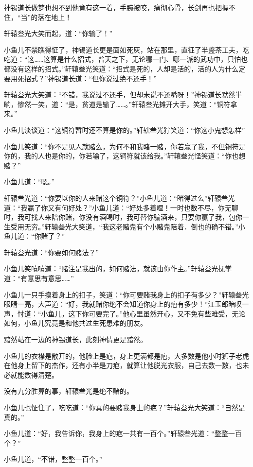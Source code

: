 \documentclass[12pt,oneside]{book}
\begin{document}
神锡道长做梦也想不到他竟有这一着，手腕被咬，痛彻心骨，长剑再也把握不住，``当''的落在地上！

轩辕叁光大笑而起，道：``你输了！''

小鱼儿不禁瞧得怔了，神锡道长更是面如死灰，站在那里，直征了半盏茶工夫，吃吃道：``这\ldots\ldots 这算是什么招式，普天之下，无论哪一门、哪一派的武功中，只怕也都没有这样的招式。''轩辕叁光笑道：``招式是死的，人却是活的，活的人为什么定要用死招式？''神锡道长道：``但你说过绝不还手！''

轩辕叁光大笑道：``不错，我说过不还手，但却未说不还嘴呀！''神锡道长默然半晌，惨然一笑，道：``是，贫道是输了\ldots\ldots。''轩辕叁光摊开大手，笑道：``铜符拿来。''

小鱼儿淡谈道：``这铜符暂时还不算是你的。''轩辖叁光狞笑道：``你这小鬼想怎样''

小鱼儿笑道：``你不是见人就赌么，为何不和我睹一赌，你若赢了我，不但铜符是你的，我的人也是你的，你若输了，这铜符就该给我。''轩辕叁光怪笑道：``你也想赌？''

小鱼儿道：``嗯。''

轩辕叁光道：``你要以你的人来赌这个铜符？''小鱼儿道：``睹得过么''轩辕叁光道：``我赢了你又有何好处？''小鱼儿道：``好处多着哩！一时也数不尽，你无聊时，我可找人来陪你赌，你没有酒喝时，我可替你骗酒来，只要你赢了我，包你一生受用无穷。''轩辕叁光大笑道，``我这老赌鬼有个小赌鬼陪着．倒也的确不错。''小鱼儿道：``你赌了？''

轩辕叁光道：``你要如何赌法？''

小鱼儿笑嘻嘻道：``赌注是我出的，如何赌法，就该由你作主。''轩辕叁光抚掌道：``有意思有意思\ldots\ldots{}''

小鱼儿一只手摸着身上的扣子，笑道：``你可要赌我身上的扣子有多少？''轩辕叁光眼睛一亮，大声道：``好，我就赌你绝不会知道你身上的疤有多少！''江玉郎暗叹一声，忖道：``小鱼儿，这下你可要完了。''他心里虽然开心，又不免有些难受，无论如何，小鱼儿究竟是和他共过生死患难的朋友。

黯然站在一边的神锡道长，此刻神情更是黯然。

小鱼儿的衣襟是敞开的，他脸上是疤，身上更满都是疤，大多数是他小时狮子老虎在他身上留下的杰作，还有小半是刀疤，就算让他脱光衣服，自己去数一数，也未必就能数得清楚。

没有九分胜算的事，轩辕叁光是绝不赌的。

小鱼儿也怔住了，吃吃道：``你真的要赌我身上的疤？''轩辕叁光大笑道：``自然是真的。''

小鱼儿道：``好，我告诉你，我身上的疤一共有一百个。''轩辕叁光道：``整整一百个？''

小鱼儿道，``不错，整整一百个。''
\end{document}
